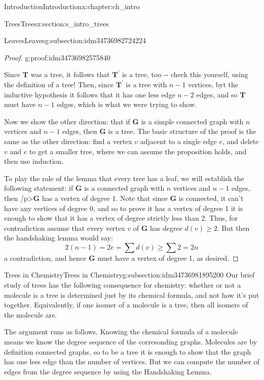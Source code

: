 \documentclass[oneside,10pt,]{book}
\numberwithin{equation}{section}
\newcommand{\bfG}{\mathbf{G}}
\newcommand{\bfT}{\mathbf{T}}
\begin{document}
\begin{chapterptx}{Introduction}{}{Introduction}{}{}{x:chapter:ch_intro}
\begin{sectionptx}{Trees}{}{Trees}{}{}{x:section:s_intro_trees}
\begin{subsectionptx}{Leaves}{}{Leaves}{}{}{g:subsection:idm34736982724224}
\begin{proof}{}{g:proof:idm34736982575840}
\par
Since \(\bfT\) was a tree, it follows that \(\bfT^\prime\) is a tree, too -{}-{} check this yourself, using the definition of a tree!  Then, since \(\bfT^\prime\) is a tree with \(n-1\) vertices, byt the inductive hypothesis it follows that it has one less edge \(n-2\) edges, and so \(\bfT\) must have \(n-1\) edges, which is what we were trying to show.%
\par
Now we show the other direction: that if \(\bfG\) is a simple connected graph with \(n\) vertices and \(n-1\) edges,  then \(\bfG\) is a tree.  The basic structure of the proof is the same as the other direction: find a vertex \(v\) adjacent to a single edge \(e\), and delete \(v\) and \(e\) to get a smaller tree, where we can assume the proposition holds, and then use induction.%
\par
To play the role of the lemma that every tree has a leaf, we will establish the following statement:  if \(\bfG\) is a connected graph with \(n\) vertices and \(n-1\) edges, then \slash{}p\textgreater{}\(\bfG\) has a vertex of degree 1.  Note that since \(\bfG\) is connected, it can't have any vertices of degree 0, and so to prove it has a vertex of degree 1 it is enough to show that it has a vertex of degree strictly less than 2.  Thus, for contradiction assume that every vertex \(v\) of \(\bfG\) has degree \(d(v)\geq 2\).  But then the handshaking lemma would say:%
\begin{equation*}
2(n-1)=2e=\sum d(v)\geq \sum 2=2n
\end{equation*}
a contradiction, and hence \(\bfG\) must have a vertex of degree 1, as desired.%
\end{proof}
\end{subsectionptx}
%
%
\typeout{************************************************}
\typeout{************************************************}
%
\begin{subsectionptx}{Trees in Chemistry}{}{Trees in Chemistry}{}{}{g:subsection:idm34736981895200}
Our brief study of trees has the following consequence for chemistry: whether or not a molecule is a tree is determined just by its chemical formula, and not how it's put together.  Equivalently, if one isomer of a molecule is a tree, then all isomers of the molecule are.%
\par
The argument runs as follows.   Knowing the chemical formula of a molecule means we know the degree sequence of the corresonding graphs.  Molecules are by definition connected graphs, so to be a tree it is enough to show that the graph has one less edge than the number of vertices.  But we can compute the number of edges from the degree sequence by using the Handshaking Lemma.%

\end{subsectionptx}
\end{sectionptx}
\end{chapterptx}
\end{document}
